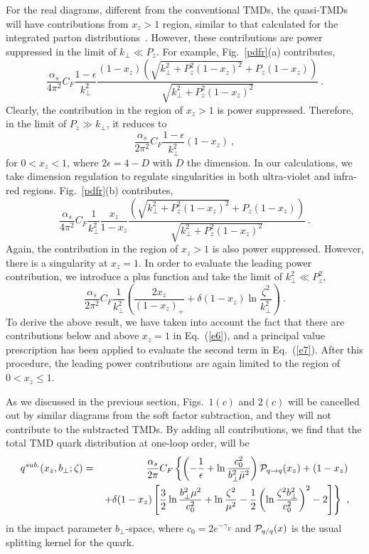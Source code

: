 \documentclass[aps,prd,preprint,tightenlines,superscriptaddress,nofootinbib]{revtex4}
\begin{document}
For the real diagrams, different from the conventional TMDs, the quasi-TMDs
will have contributions from $x_z>1$ region, similar to that calculated for the 
integrated parton distributions~\cite{Ma:2014jla,Xiong:2013bka}. 
However, these contributions are power suppressed in the limit of $k_\perp\ll P_z$. 
For example, Fig.~\ref{pdfr}(a) contributes,
\begin{equation}
\frac{\alpha_s}{4\pi^2}C_F\frac{1-\epsilon}{k_\perp^2}\frac{(1-x_z)\left(\sqrt{k_\perp^2+P_z^2(1-x_z)^2}+P_z(1-x_z)\right)}{\sqrt{k_\perp^2+P_z^2(1-x_z)^2}} \ .
\end{equation}
Clearly, the contribution in the 
region of $x_z>1$ is power suppressed. Therefore, in the limit of $P_z\gg k_\perp$, it reduces to
\begin{equation}
\frac{\alpha_s}{2\pi^2}C_F\frac{1-\epsilon}{k_\perp^2}(1-x_z) \ ,
\end{equation}
for $0<x_z<1$, where $2\epsilon=4-D$ with $D$ the dimension. In our calculations, we take
dimension regulation to regulate singularities in both ultra-violet and
infra-red regions. 
Fig.~\ref{pdfr}(b) contributes,
\begin{equation}
\frac{\alpha_s}{4\pi^2}C_F\frac{1}{k_\perp^2}\frac{x_z}{1-x_z}
\frac{\left(\sqrt{k_\perp^2+P_z^2(1-x_z)^2}+P_z(1-x_z)\right)}{\sqrt{k_\perp^2+P_z^2(1-x_z)^2}} \ . \label{e6}
\end{equation}
Again, the contribution in the region of $x_z>1$ is also power suppressed. However, there is
a singularity at $x_z=1$. In order to evaluate the leading power contribution, we introduce a plus function and 
take the limit of $k_\perp^2\ll P_z^2$, 
\begin{equation}
\frac{\alpha_s}{2\pi^2}C_F\frac{1}{k_\perp^2}\left(\frac{2x_z}{(1-x_z)_+}+\delta(1-x_z)\ln\frac{\zeta^2}{k_\perp^2}\right) \ .\label{e7}
\end{equation}
To derive the above result, we have taken into account the fact that there are
contributions below and above $x_z=1$ in Eq.~(\ref{e6}), and a principal 
value prescription has been applied to evaluate the second term in Eq.~(\ref{e7}).
After this procedure, the leading power contributions are again limited
to the region of $0<x_z\le 1$.

As we discussed in the previous section, Figs.~$1(c )$ and $2(c )$ will
be cancelled out by similar diagrams from the soft factor subtraction, and they 
will not contribute to the subtracted TMDs. By adding all contributions, we
find that the total TMD quark distribution at one-loop order, will be
\begin{eqnarray}
q^{sub.}(x_z,b_\perp;\zeta)&=&\frac{\alpha_s}{2\pi}C_F\left\{\left(-\frac{1}{\epsilon}+\ln\frac{c_0^2}{b_\perp^2\bar\mu^2}\right){\cal P}_{q\to q}(x_z)+(1-x_z)\right.\nonumber\\
&&\left.+\delta(1-x_z)\left[\frac{3}{2}\ln\frac{b_\perp^2\mu^2}{c_0^2}+\ln\frac{\zeta^2}{\mu^2}
-\frac{1}{2}\left(\ln\frac{\zeta^2b_\perp^2}{c_0^2}\right)^2-2\right]\right\} \ , \label{oneloop}
\end{eqnarray}
in the impact parameter $b_\perp$-space, where $c_0=2e^{-\gamma_E}$ and ${\cal P}_{q/q}(x)$ is the usual splitting kernel for the quark.
\end{document}
